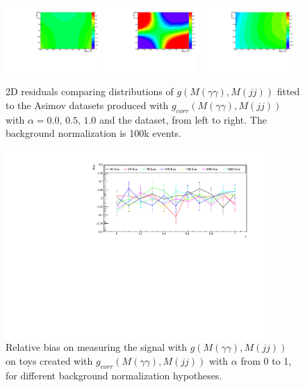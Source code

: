 \begin{figure}[h]
  \centering
\includegraphics[width=0.32\textwidth]{figures/sec-background/correlation/res_th2F_res_th2f_res_alpha_00_n100000.pdf}
\includegraphics[width=0.32\textwidth]{figures/sec-background/correlation/res_th2F_res_th2f_res_alpha_05_n100000.pdf}
\includegraphics[width=0.32\textwidth]{figures/sec-background/correlation/res_th2F_res_th2f_res_alpha_10_n100000.pdf}
  \caption{2D residuals comparing distributions of $g(M(\gamma\gamma),M(jj))$ fitted to the Asimov datasets produced with $g_{corr}(M(\gamma\gamma),M(jj))$ with $\alpha = 0.0,\,0.5,\,1.0$ and the dataset, from left to right. The background normalization is 100k events.}
  \label{fig:res_norm100000}
\end{figure}

\begin{figure}[h]
  \centering
\includegraphics[width=0.9\textwidth]{figures/sec-background/CorrelationBias.pdf}
\caption{Relative bias on measuring the signal with $g(M(\gamma\gamma),M(jj))$ on toys created with $g_{corr}(M(\gamma\gamma),M(jj))$ with $\alpha$ from 0 to 1, for different background normalization hypotheses.}
\label{fig:corr_bias}
\end{figure}

